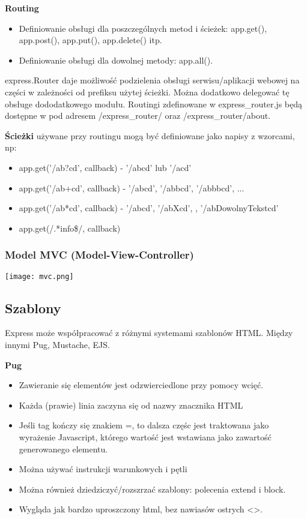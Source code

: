 \documentclass[../main.tex]{subfiles}
\begin{document}
    \textbf{Routing}
    \begin{itemize}
        \item Definiowanie obsługi dla poszczególnych metod i ścieżek: app.get(), app.post(), app.put(), app.delete() itp.
        \item Definiowanie obsługi dla dowolnej metody: app.all().
    \end{itemize}
    express.Router daje możliwość podzielenia obsługi serwisu/aplikacji webowej na części w zależności od prefiksu użytej ścieżki.
    Można dodatkowo delegować tę obsługe dododatkowego modułu. Routingi zdefinowane w express\_router.js będą dostępne w pod adresem /express\_router/ oraz /express\_router/about.

    \textbf{Ścieżki} używane przy routingu mogą być definiowane jako napisy z wzorcami, np:
    \begin{itemize}
        \item app.get('/ab?cd', callback) - '/abcd' lub '/acd'
        \item app.get('/ab+cd', callback) - '/abcd', '/abbcd', '/abbbcd', ...
        \item app.get('/ab*cd', callback) - '/abcd', '/abXcd', , '/abDowolnyTekstcd'
        \item app.get(/.*info\$/, callback)
    \end{itemize}

    \subsubsection{Model MVC (Model-View-Controller)}
    \texttt{[image: mvc.png]}

    \subsection{Szablony}
    Express może współpracować z różnymi systemami szablonów HTML. Między innymi Pug, Mustache, EJS.

    \textbf{Pug}
    \begin{itemize}
        \item Zawieranie się elementów jest odzwierciedlone przy pomocy wcięć.
        \item Każda (prawie) linia zaczyna się od nazwy znacznika HTML
        \item Jeśli tag kończy się znakiem =, to dalsza częśc jest traktowana jako wyrażenie Javascript, którego wartość jest wstawiana jako zawartość generowanego elementu.
        \item Można używać instrukcji warunkowych i pętli
        \item Można również dziedziczyć/rozszrzać szablony: polecenia extend i block.
        \item Wygląda jak bardzo uproszczony html, bez nawiasów ostrych <>.
    \end{itemize}
\end{document}
